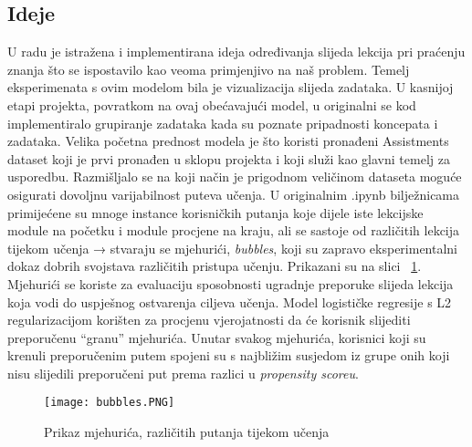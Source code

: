 \subsection{Ideje}
U radu je istražena i implementirana ideja određivanja slijeda lekcija pri praćenju znanja što se ispostavilo kao veoma primjenjivo na naš problem. Temelj eksperimenata s ovim modelom bila je vizualizacija slijeda zadataka. U kasnijoj etapi projekta, povratkom na ovaj obećavajući model, u originalni se kod implementiralo grupiranje zadataka kada su poznate pripadnosti koncepata i zadataka. Velika početna prednost modela je što koristi pronađeni Assistments dataset koji je prvi pronađen u sklopu projekta i koji služi kao glavni temelj za usporedbu. Razmišljalo se na koji način je prigodnom veličinom dataseta moguće osigurati dovoljnu varijabilnost puteva učenja. \newline
U originalnim .ipynb bilježnicama primijećene su mnoge instance korisničkih putanja koje dijele iste lekcijske module na početku i module procjene na kraju, ali se sastoje od različitih lekcija tijekom učenja → stvaraju se mjehurići, \textit{bubbles}, koji su zapravo eksperimentalni dokaz dobrih svojstava različitih pristupa učenju. Prikazani su na slici ~\ref{fig:bubbles}. Mjehurići se koriste za evaluaciju sposobnosti ugradnje preporuke slijeda lekcija koja vodi do uspješnog ostvarenja ciljeva učenja. Model logističke regresije s L2 regularizacijom korišten za procjenu vjerojatnosti da će korisnik slijediti preporučenu “granu” mjehurića. Unutar svakog mjehurića, korisnici koji su krenuli preporučenim putem spojeni su s najbližim susjedom iz grupe onih koji nisu slijedili preporučeni put prema razlici u \textit{propensity scoreu}.

\begin{figure}[!htb]
\centering
\texttt{[image: bubbles.PNG]}
\caption{Prikaz mjehurića, različitih putanja tijekom učenja \citep{lentil}}
\label{fig:bubbles}
\end{figure}


